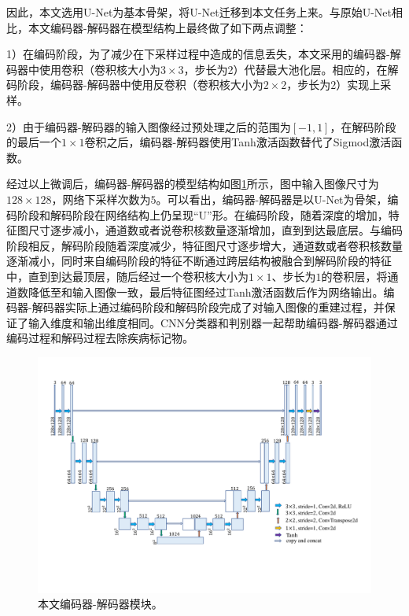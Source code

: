 因此，本文选用U-Net为基本骨架，将U-Net迁移到本文任务上来。与原始U-Net相比，本文编码器-解码器在模型结构上最终做了如下两点调整：

1）在编码阶段，为了减少在下采样过程中造成的信息丢失，本文采用的编码器-解码器中使用卷积（卷积核大小为$3\times 3$，步长为2）代替最大池化层。相应的，在解码阶段，编码器-解码器中使用反卷积（卷积核大小为$2\times 2$，步长为$2$）实现上采样。

2）由于编码器-解码器的输入图像经过预处理之后的范围为$[-1,1]$，在解码阶段的最后一个$1\times 1$卷积之后，编码器-解码器使用Tanh激活函数替代了Sigmod激活函数。

经过以上微调后，编码器-解码器的模型结构如图\ref{fig:auto_encoder_architecture}所示，图中输入图像尺寸为$128\times 128$，网络下采样次数为$5$。可以看出，编码器-解码器是以U-Net为骨架，编码阶段和解码阶段在网络结构上仍呈现“U”形。在编码阶段，随着深度的增加，特征图尺寸逐步减小，通道数或者说卷积核数量逐渐增加，直到到达最底层。与编码阶段相反，解码阶段随着深度减少，特征图尺寸逐步增大，通道数或者卷积核数量逐渐减小，同时来自编码阶段的特征不断通过跨层结构被融合到解码阶段的特征中，直到到达最顶层，随后经过一个卷积核大小为$1\times 1$、步长为$1$的卷积层，将通道数降低至和输入图像一致，最后特征图经过Tanh激活函数后作为网络输出。编码器-解码器实际上通过编码阶段和解码阶段完成了对输入图像的重建过程，并保证了输入维度和输出维度相同。CNN分类器和判别器一起帮助编码器-解码器通过编码过程和解码过程去除疾病标记物。
\begin{figure}[h]
	\centering
	\includegraphics[width=1.0\textwidth]{figure/auto_encoder_architecture}
	\caption[本文编码器-解码器模块]{本文编码器-解码器模块。}
	\label{fig:auto_encoder_architecture}
\end{figure}

